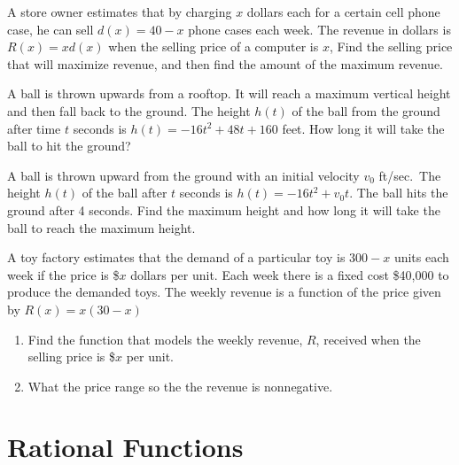 \documentclass[
  en,11pt]{elegantbook}
\let\BeginKnitrBlock\begin \let\EndKnitrBlock\end
\begin{document}
\BeginKnitrBlock{exercise}
\protect\hypertarget{exr:unnamed-chunk-270}{}{\label{exr:unnamed-chunk-270} }
A store owner estimates that by charging \(x\) dollars each for a certain cell phone case, he can sell \(d(x)=40 - x\) phone cases each week. The revenue in dollars is \(R(x)=xd(x)\) when the selling price of a computer is \(x\), Find the selling price that will maximize revenue, and then find the amount of the maximum revenue.
\EndKnitrBlock{exercise}

\BeginKnitrBlock{exercise}
\protect\hypertarget{exr:unnamed-chunk-271}{}{\label{exr:unnamed-chunk-271} }
A ball is thrown upwards from a rooftop. It will reach a maximum vertical height and then fall back to the ground. The height \(h(t)\) of the ball from the ground after time \(t\) seconds is \(h(t)=-16t^2 + 48t + 160\) feet. How long it will take the ball to hit the ground?
\EndKnitrBlock{exercise}

\BeginKnitrBlock{exercise}
\protect\hypertarget{exr:unnamed-chunk-272}{}{\label{exr:unnamed-chunk-272} }
A ball is thrown upward from the ground with an initial velocity \(v_0\) ft/sec.~The height \(h(t)\) of the ball after \(t\) seconds is \(h(t)= -16t^2 + v_0t\). The ball hits the ground after 4 seconds.
Find the maximum height and how long it will take the ball to reach the maximum height.
\EndKnitrBlock{exercise}

\BeginKnitrBlock{exercise}
\protect\hypertarget{exr:unnamed-chunk-273}{}{\label{exr:unnamed-chunk-273} }
A toy factory estimates that the demand of a particular toy is \(300 -x\) units each week if the price is \$\(x\) dollars per unit. Each week there is a fixed cost \$40,000 to produce the demanded toys.
The weekly revenue is a function of the price given by \(R(x)=x(30-x)\)

\begin{enumerate}
\def\labelenumi{\arabic{enumi}.}

\item
  Find the function that models the weekly revenue, \(R\), received when the selling price is \$\(x\) per unit.
\item
  What the price range so the the revenue is nonnegative.
\end{enumerate}
\EndKnitrBlock{exercise}

\hypertarget{rational-functions}{%
\chapter{Rational Functions}\label{rational-functions}}
\end{document}
